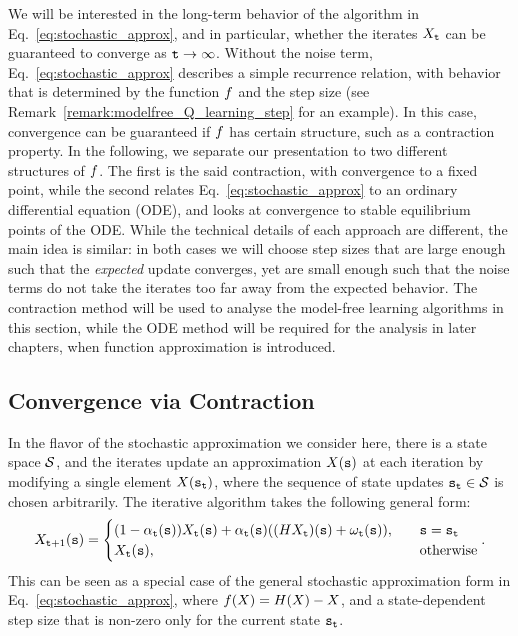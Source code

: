 We will be interested in the long-term behavior of the algorithm in Eq.~\ref{eq:stochastic_approx}, and in particular, whether the iterates $X_{\tt t}$ can be guaranteed to converge as ${\tt t} \to \infty$.
Without the noise term, Eq.~\ref{eq:stochastic_approx} describes a simple recurrence relation, with behavior that is determined by the function $f$ and the step size (see Remark~\ref{remark:modelfree_Q_learning_step} for an example). In this case, convergence can be guaranteed if $f$ has certain structure, such as a contraction property. In the following, we separate our presentation to two different structures of $f$. The first is the said contraction, with convergence to a fixed point, while the second relates Eq.~\ref{eq:stochastic_approx} to an ordinary differential equation (ODE), and looks at convergence to stable equilibrium points of the ODE. While the technical details of each approach are different, the main idea is similar: in both cases we will choose step sizes that are large enough such that the \textit{expected} update converges, yet are small enough such that the noise terms do not take the iterates too far away from the expected behavior. The contraction method will be used to analyse the model-free learning algorithms in this section, while the ODE method will be required for the analysis in later chapters, when function approximation is introduced.

\subsection{Convergence via Contraction}
In the flavor of the stochastic approximation we consider here, there is a state space $\mathcal{S}$, and
the iterates update an approximation $X({\tt s})$ at each iteration by modifying a single element $X({\tt s}_{\tt t})$, where the sequence of state updates ${\tt s}_{\tt t} \in \mathcal{S}$ is chosen arbitrarily. 
The iterative algorithm takes the following general form:
\[
X_{{\tt t}+1}({\tt s}) =
\begin{cases} 
(1-\alpha_{\tt t}({\tt s}))X_{\tt t}({\tt s})+\alpha_{\tt t}({\tt s})((HX_{\tt t})({\tt s})+\omega_{\tt t}({\tt s})), & \quad {\tt s} = {\tt s}_{\tt t} \\
X_{\tt t}({\tt s}), & \quad \textrm{otherwise}
\end{cases}.
\]
This can be seen as a special case of the general stochastic approximation form in Eq.~\ref{eq:stochastic_approx}, where $f(X) = H(X) - X$, and a state-dependent step size that is non-zero only for the current state ${\tt s}_{\tt t}$.

